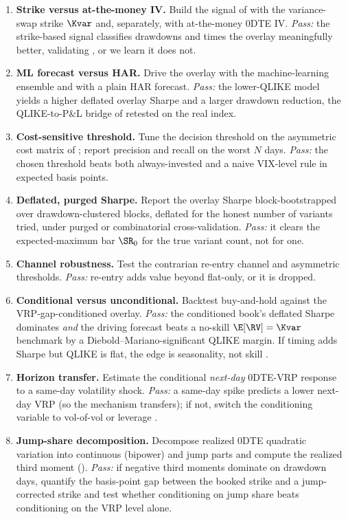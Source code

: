 \begin{projectconnection}
\begin{enumerate}
  \item \textbf{Strike versus at-the-money IV.} Build the signal of  with the variance-swap strike $\Kvar$ and, separately, with at-the-money 0DTE IV. \emph{Pass:} the strike-based signal classifies drawdowns and times the overlay meaningfully better, validating , or we learn it does not.
  \item \textbf{ML forecast versus HAR.} Drive the overlay with the machine-learning ensemble and with a plain HAR forecast. \emph{Pass:} the lower-QLIKE model yields a higher deflated overlay Sharpe and a larger drawdown reduction, the QLIKE-to-P\&L bridge of  retested on the real index.
  \item \textbf{Cost-sensitive threshold.} Tune the decision threshold on the asymmetric cost matrix of ; report precision and recall on the worst $N$ days. \emph{Pass:} the chosen threshold beats both always-invested and a naive VIX-level rule in expected basis points.
  \item \textbf{Deflated, purged Sharpe.} Report the overlay Sharpe block-bootstrapped over drawdown-clustered blocks, deflated for the honest number of variants tried, under purged or combinatorial cross-validation. \emph{Pass:} it clears the expected-maximum bar $\SR_0$ for the true variant count, not for one.
  \item \textbf{Channel robustness.} Test the contrarian re-entry channel and asymmetric thresholds. \emph{Pass:} re-entry adds value beyond flat-only, or it is dropped.
  \item \textbf{Conditional versus unconditional.} Backtest buy-and-hold against the VRP-gap-conditioned overlay. \emph{Pass:} the conditioned book's deflated Sharpe dominates \emph{and} the driving forecast beats a no-skill $\E[\RV]=\Kvar$ benchmark by a Diebold--Mariano-significant QLIKE margin. If timing adds Sharpe but QLIKE is flat, the edge is seasonality, not skill \citep[the tension between][]{Vilkov2024, AlmeidaFreireHizmeri2024}.
  \item \textbf{Horizon transfer.} Estimate the conditional \emph{next-day} 0DTE-VRP response to a same-day volatility shock. \emph{Pass:} a same-day spike predicts a lower next-day VRP (so the \citet{Yang2024} mechanism transfers); if not, switch the conditioning variable to vol-of-vol or leverage \citep{BandiFusariReno2024}.
  \item \textbf{Jump-share decomposition.} Decompose realized 0DTE quadratic variation into continuous (bipower) and jump parts and compute the realized third moment (). \emph{Pass:} if negative third moments dominate on drawdown days, quantify the basis-point gap between the booked strike and a jump-corrected strike \citep{DuKapadia2012} and test whether conditioning on jump share beats conditioning on the VRP level alone.
\end{enumerate}
\end{projectconnection}

